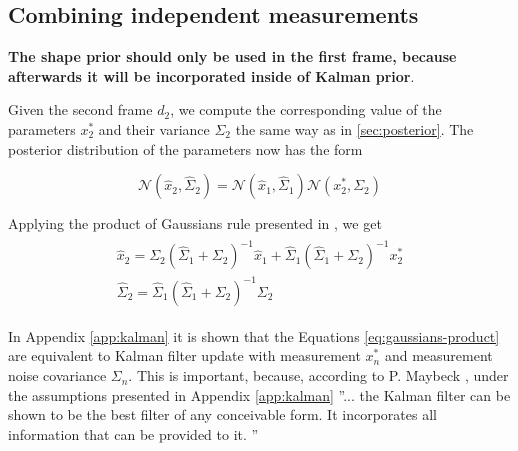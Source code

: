 \documentclass[10pt,twocolumn,letterpaper]{article}
\begin{document}
\subsection {Combining independent measurements} \label{sec:combining}

\textbf{\color{accent}The shape prior should only be used in the first frame, because afterwards it will be incorporated inside of Kalman prior}.

Given the second frame $d_2$, we compute the corresponding value of the parameters $x_2^*$ and their variance $\Sigma_2$ the same way as in \ref{sec:posterior}. The posterior distribution of the parameters now has the form 

\begin{equation}
\mathcal{N}(\hat{x}_2, \hat{\Sigma}_2) = \mathcal{N}(\hat{x}_1, \hat{\Sigma}_1) \mathcal{N}(x_2^*, \Sigma_2)
\end{equation}

Applying the product of Gaussians rule presented in \cite{petersen2008matrix}, we get 
\begin{align}
\begin{split}
\hat{x}_2 = \Sigma_2 (\hat{\Sigma}_1 + \Sigma_2)^{-1} \hat{x}_1 + 
\hat{\Sigma}_1 (\hat{\Sigma}_1 + \Sigma_2)^{-1} x_2^*\\
\hat{\Sigma}_2 = \hat{\Sigma}_1 (\hat{\Sigma}_1 + \Sigma_2)^{-1} \Sigma_2
\end{split} \label{eq:gaussians-product}
\end{align}

In Appendix \ref{app:kalman} it is shown that the Equations \ref{eq:gaussians-product} are equivalent to Kalman filter update with measurement $x_n^*$ and measurement noise covariance $\Sigma_n$. This is important, because, according to P. Maybeck \cite{maybeck1979stochastic}, under the assumptions presented in Appendix \ref{app:kalman} ''... the Kalman filter can be shown to be the best filter of any conceivable form. It incorporates all information that can be provided to it. ''
\end{document}
